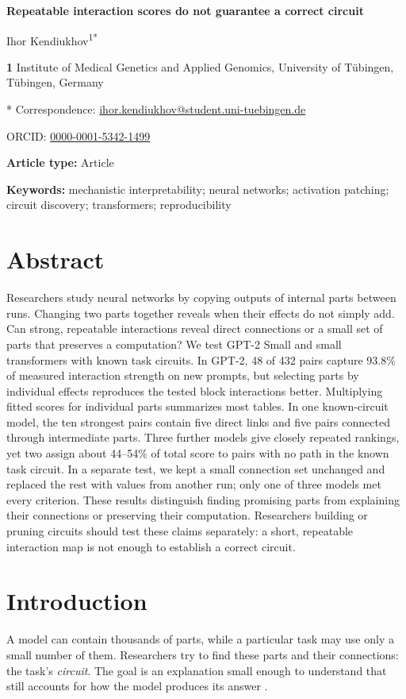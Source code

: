 \documentclass[11pt,letterpaper]{article}
\begin{document}
\linenumbers
{\Large\textbf{Repeatable interaction scores do not guarantee a correct circuit}}

\bigskip
Ihor Kendiukhov\textsuperscript{1*}

\textbf{1} Institute of Medical Genetics and Applied Genomics, University of Tübingen, Tübingen, Germany

* Correspondence: \href{mailto:ihor.kendiukhov@student.uni-tuebingen.de}{ihor.kendiukhov@student.uni-tuebingen.de}

ORCID: \href{https://orcid.org/0000-0001-5342-1499}{0000-0001-5342-1499}

\textbf{Article type:} Article

\textbf{Keywords:} mechanistic interpretability; neural networks; activation patching; circuit discovery; transformers; reproducibility
\clearpage
\section*{Abstract}
Researchers study neural networks by copying outputs of internal parts between
runs. Changing two parts together reveals when their effects do not simply
add. Can strong, repeatable interactions reveal direct connections or a small
set of parts that preserves a computation? We test GPT-2 Small and small transformers with known
task circuits. In GPT-2, 48 of 432 pairs capture 93.8\% of measured interaction
strength on new prompts, but selecting parts by individual effects reproduces
the tested block interactions better. Multiplying fitted scores for individual
parts summarizes most tables. In one known-circuit model, the ten strongest
pairs contain five direct links and five pairs connected through intermediate
parts. Three further models give closely repeated rankings, yet two assign
about 44--54\% of total score to pairs with no path in the known task circuit.
In a separate test, we kept a small connection set unchanged and replaced the
rest with values from another run; only one of three models met every criterion.
These results distinguish finding promising parts from explaining their
connections or preserving their computation. Researchers building or pruning
circuits should test these claims separately: a short, repeatable interaction
map is not enough to establish a correct circuit.


\section*{Introduction}
A model can contain thousands of parts, while a particular task may use only
a small number of them. Researchers try to find these parts and their
connections: the task's \emph{circuit}. The goal is an explanation small enough
to understand that still accounts for how the model produces its answer
\cite{conmy2023acdc,hanna2024faithfulness,kramar2024atp}.
\end{document}
